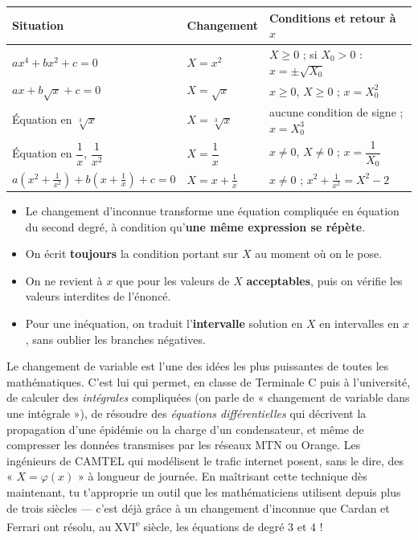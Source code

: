 \documentclass[11pt]{article}
\begin{document}
\begin{center}
\begin{tabularx}{\linewidth}{|l|l|X|}
\hline
\rowcolor{popblueL} \textbf{Situation} & \textbf{Changement} & \textbf{Conditions et retour à $x$} \\
\hline
$ax^4 + bx^2 + c = 0$ & $X = x^2$ & $X \geq 0$ ; si $X_0 > 0$ : $x = \pm\sqrt{X_0}$ \\
\hline
$ax + b\sqrt{x} + c = 0$ & $X = \sqrt{x}$ & $x \geq 0$, $X \geq 0$ ; $x = X_0^2$ \\
\hline
Équation en $\sqrt[3]{x}$ & $X = \sqrt[3]{x}$ & aucune condition de signe ; $x = X_0^3$ \\
\hline
Équation en $\dfrac{1}{x}$, $\dfrac{1}{x^2}$ & $X = \dfrac{1}{x}$ & $x \neq 0$, $X \neq 0$ ; $x = \dfrac{1}{X_0}$ \\
\hline
$a\left(x^2 + \frac{1}{x^2}\right) + b\left(x + \frac{1}{x}\right) + c = 0$ & $X = x + \frac{1}{x}$ & $x \neq 0$ ; $x^2 + \frac{1}{x^2} = X^2 - 2$ \\
\hline
\end{tabularx}
\end{center}

\begin{aretenir}[L'essentiel]
\begin{itemize}
\item Le changement d'inconnue transforme une équation compliquée en équation du second degré, à condition qu'\textbf{une même expression se répète}.
\item On écrit \textbf{toujours} la condition portant sur $X$ au moment où on le pose.
\item On ne revient à $x$ que pour les valeurs de $X$ \textbf{acceptables}, puis on vérifie les valeurs interdites de l'énoncé.
\item Pour une inéquation, on traduit l'\textbf{intervalle} solution en $X$ en intervalles en $x$, sans oublier les branches négatives.
\end{itemize}
\end{aretenir}

\begin{savaistu}
Le changement de variable est l'une des idées les plus puissantes de toutes les mathématiques. C'est lui qui permet, en classe de Terminale C puis à l'université, de calculer des \emph{intégrales} compliquées (on parle de « changement de variable dans une intégrale »), de résoudre des \emph{équations différentielles} qui décrivent la propagation d'une épidémie ou la charge d'un condensateur, et même de compresser les données transmises par les réseaux MTN ou Orange. Les ingénieurs de CAMTEL qui modélisent le trafic internet posent, sans le dire, des « $X = \varphi(x)$ » à longueur de journée. En maîtrisant cette technique dès maintenant, tu t'approprie un outil que les mathématiciens utilisent depuis plus de trois siècles — c'est déjà grâce à un changement d'inconnue que Cardan et Ferrari ont résolu, au XVI\textsuperscript{e} siècle, les équations de degré $3$ et $4$ !
\end{savaistu}
\end{document}
